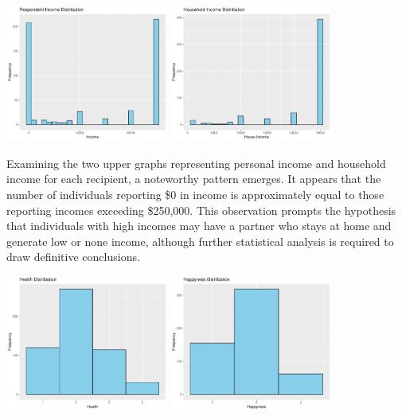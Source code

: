 \documentclass{article}[13pt]
\begin{document}
\includegraphics[width=0.4\textwidth]{5_personal_income_number.pdf}
\includegraphics[width=0.4\textwidth]{7_house_income_number.pdf}

Examining the two upper graphs representing personal income and household income for each 
recipient, a noteworthy pattern emerges. It appears that the number of individuals reporting 
\$0 in income is approximately equal to those reporting incomes exceeding \$250,000. 
This observation prompts the hypothesis that individuals with high incomes may have a 
partner who stays at home and generate low or none income, although further statistical analysis is required to draw definitive conclusions.
\newline

\includegraphics[width=0.4\textwidth]{8_health_distribution.pdf}
\includegraphics[width=0.4\textwidth]{9_happines_distribution.pdf}
\end{document}
